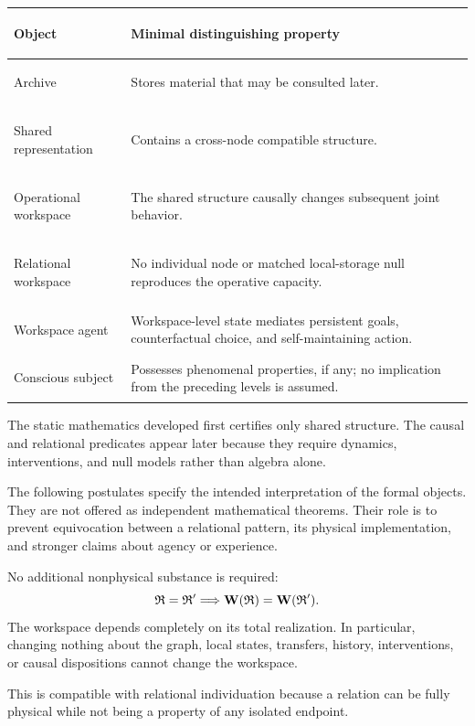 
\begin{center}
\small
\begin{tabularx}{\textwidth}{@{}>{\bfseries\raggedright\arraybackslash}p{}>{\raggedright\arraybackslash}X@{}}
\toprule
Object & Minimal distinguishing property \\
\midrule
Archive & Stores material that may be consulted later. \\
Shared representation & Contains a cross-node compatible structure. \\
Operational workspace & The shared structure causally changes subsequent joint behavior. \\
Relational workspace & No individual node or matched local-storage null reproduces the operative capacity. \\
Workspace agent & Workspace-level state mediates persistent goals, counterfactual choice, and self-maintaining action. \\
Conscious subject & Possesses phenomenal properties, if any; no implication from the preceding levels is assumed. \\
\bottomrule
\end{tabularx}
\end{center}

The static mathematics developed first certifies only shared structure. The
causal and relational predicates appear later because they require dynamics,
interventions, and null models rather than algebra alone.


The following postulates specify the intended interpretation of the formal
objects. They are not offered as independent mathematical theorems. Their
role is to prevent equivocation between a relational pattern, its physical
implementation, and stronger claims about agency or experience.


No additional nonphysical substance is required:
\[
\mathfrak R=\mathfrak R'
\Longrightarrow
\mathbf W(\mathfrak R)=\mathbf W(\mathfrak R').
\]
The workspace depends completely on its total realization. In particular,
changing nothing about the graph, local states, transfers, history,
interventions, or causal dispositions cannot change the workspace.

This is compatible with relational individuation because a relation can be
fully physical while not being a property of any isolated endpoint.

